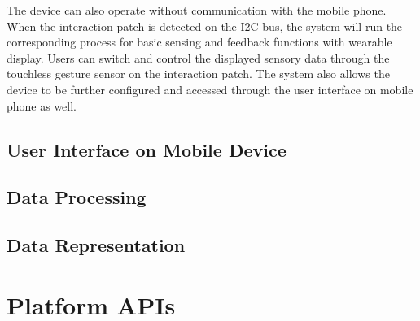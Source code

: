 The device can also operate without communication with the mobile phone.
When the interaction patch is detected on the I2C bus, the system will run the corresponding process for basic sensing and feedback functions with wearable display.
Users can switch and control the displayed sensory data through the touchless gesture sensor on the interaction patch.
The system also allows the device to be further configured and accessed through the user interface on mobile phone as well.

\subsection{User Interface on Mobile Device}


\subsection{Data Processing}

\subsection{Data Representation}

\section{Platform APIs}



\let\cleardoublepage\clearpage